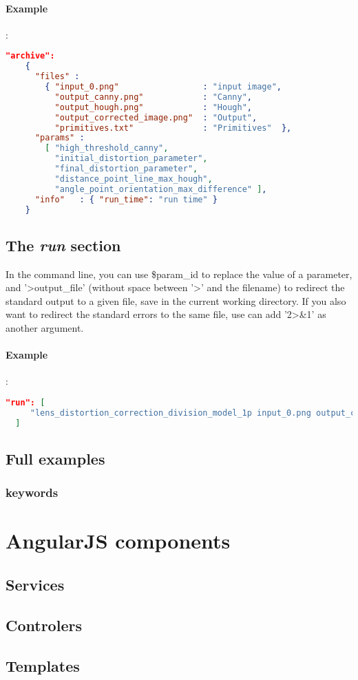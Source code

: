 \paragraph{Example}:\\
\begin{lstlisting}[language=json,firstnumber=1]
  "archive":
    {
      "files" : 
        { "input_0.png"                 : "input image",
          "output_canny.png"            : "Canny",
          "output_hough.png"            : "Hough",
          "output_corrected_image.png"  : "Output",
          "primitives.txt"              : "Primitives"  },
      "params" :  
        [ "high_threshold_canny", 
          "initial_distortion_parameter", 
          "final_distortion_parameter", 
          "distance_point_line_max_hough", 
          "angle_point_orientation_max_difference" ],
      "info"   : { "run_time": "run time" }
    }
\end{lstlisting}

\subsection{The \emph{run} section}

In the command line, you can use \$param\_id to replace the value of a parameter,
and '\textgreater output\_file' (without space between '\textgreater' and the filename) to redirect the
standard output to a given file, save in the current working directory. 
If you also want to redirect the standard errors to the same file, use can add 
'2\textgreater\&1' as another argument.

\paragraph{Example}:\\
\begin{lstlisting}[language=json,firstnumber=1]
  "run": [
     "lens_distortion_correction_division_model_1p input_0.png output_canny.png output_hough.png output_corrected_image.png $high_threshold_canny $initial_distortion_parameter $final_distortion_parameter $distance_point_line_max_hough $angle_point_orientation_max_difference primitives.txt"
  ]
\end{lstlisting}

\subsection{Full examples}


\subsubsection{keywords}

\section{AngularJS components}
\subsection{Services}
\subsection{Controlers}
\subsection{Templates}
